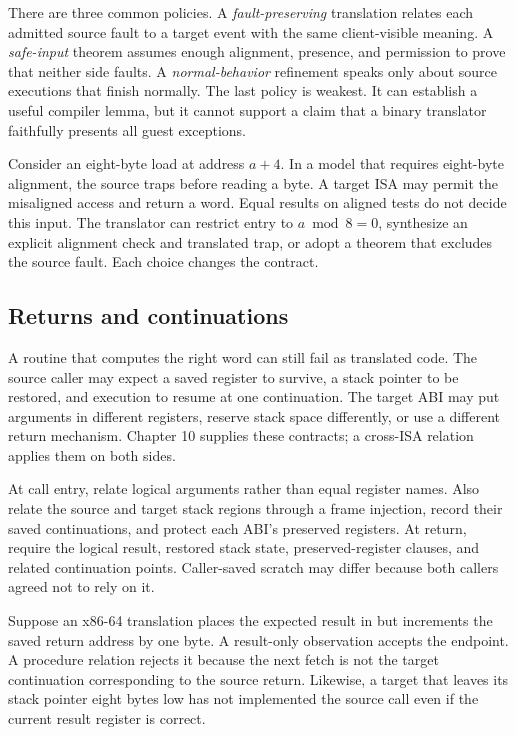 There are three common policies. A \emph{fault-preserving} translation relates
each admitted source fault to a target event with the same client-visible
meaning. A \emph{safe-input} theorem assumes enough alignment, presence, and
permission to prove that neither side faults. A \emph{normal-behavior}
refinement speaks only about source executions that finish normally. The last
policy is weakest. It can establish a useful compiler lemma, but it cannot
support a claim that a binary translator faithfully presents all guest
exceptions.

Consider an eight-byte load at address \(a+4\). In a model that requires
eight-byte alignment, the source traps before reading a byte. A target ISA may
permit the misaligned access and return a word. Equal results on aligned tests
do not decide this input. The translator can restrict entry to
\(a\bmod8=0\), synthesize an explicit alignment check and translated trap, or
adopt a theorem that excludes the source fault. Each choice changes the
contract.

\subsection{Returns and continuations}

A routine that computes the right word can still fail as translated code. The
source caller may expect a saved register to survive, a stack pointer to be
restored, and execution to resume at one continuation. The target ABI may put
arguments in different registers, reserve stack space differently, or use a
different return mechanism. Chapter 10 supplies these contracts; a cross-ISA
relation applies them on both sides.

At call entry, relate logical arguments rather than equal register names. Also
relate the source and target stack regions through a frame injection, record
their saved continuations, and protect each ABI's preserved registers. At
return, require the logical result, restored stack state, preserved-register
clauses, and related continuation points. Caller-saved scratch may differ
because both callers agreed not to rely on it.

\begin{example}[title={A correct value with a wrong continuation}]
Suppose an x86-64 translation places the expected result in  but
increments the saved return address by one byte. A result-only observation
accepts the endpoint. A procedure relation rejects it because the next
fetch is not the target continuation corresponding to the source return.
Likewise, a target that leaves its stack pointer eight bytes low has not
implemented the source call even if the current result register is correct.
\end{example}

